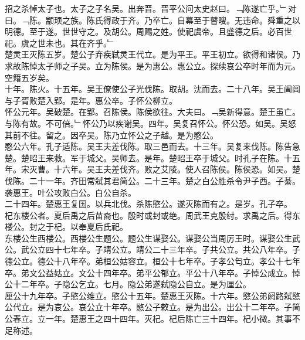 \documentclass{zhvt-classic}
\begin{document}
\hspace*{2em}招之杀悼太子也。太子之子名吴。出奔晋。晋平公问太史赵曰。﹁陈遂亡乎。﹂对曰。﹁陈。颛顼之族。陈氏得政于齐。乃卒亡。自幕至于瞽瞍。无违命。舜重之以明德。至于遂。世世守之。及胡公。周赐之姓。使祀虞帝。且盛德之后。必百世祀。虞之世未也。其在齐乎。﹂\\
\hspace*{2em}楚灵王灭陈五岁。楚公子弃疾弑灵王代立。是为平王。平王初立。欲得和诸侯。乃求故陈悼太子师之子吴。立为陈侯。是为惠公。惠公立。探续哀公卒时年而为元。空籍五岁矣。\\
\hspace*{2em}十年。陈火。十五年。吴王僚使公子光伐陈。取胡。沈而去。二十八年。吴王阖闾与子胥败楚入郢。是年。惠公卒。子怀公柳立。\\
\hspace*{2em}怀公元年。吴破楚。在郢。召陈侯。陈侯欲往。大夫曰。﹁吴新得意。楚王虽亡。与陈有故。不可倍。﹂怀公乃以疾谢吴。四年。吴复召怀公。怀公恐。如吴。吴怒其前不往。留之。因卒吴。陈乃立怀公之子越。是为愍公。\\
\hspace*{2em}愍公六年。孔子适陈。吴王夫差伐陈。取三邑而去。十三年。吴复来伐陈。陈告急楚。楚昭王来救。军于城父。吴师去。是年。楚昭王卒于城父。时孔子在陈。十五年。宋灭曹。十六年。吴王夫差伐齐。败之艾陵。使人召陈侯。陈侯恐。如吴。楚伐陈。二十一年。齐田常弑其君简公。二十三年。楚之白公胜杀令尹子西。子綦。袭惠王。叶公攻败白公。白公自杀。\\
\hspace*{2em}二十四年。楚惠王复国。以兵北伐。杀陈愍公。遂灭陈而有之。是岁。孔子卒。\\
\hspace*{2em}杞东楼公者。夏后禹之后苗裔也。殷时或封或绝。周武王克殷纣。求禹之后。得东楼公。封之于杞。以奉夏后氏祀。\\
\hspace*{2em}东楼公生西楼公。西楼公生题公。题公生谋娶公。谋娶公当周厉王时。谋娶公生武公。武公立四十七年卒。子靖公立。靖公二十三年卒。子共公立。共公八年卒。子德公立。德公十八年卒。弟桓公姑容立。桓公十七年卒。子孝公匄立。孝公十七年卒。弟文公益姑立。文公十四年卒。弟平公郁立。平公十八年卒。子悼公成立。悼公十二年卒。子隐公乞立。七月。隐公弟遂弑隐公自立。是为厘公。\\
\hspace*{2em}厘公十九年卒。子愍公维立。愍公十五年。楚惠王灭陈。十六年。愍公弟阏路弑愍公代立。是为哀公。哀公立十年卒。愍公子敕立。是为出公。出公十二年卒。子简公春立。立一年。楚惠王之四十四年。灭杞。杞后陈亡三十四年。杞小微。其事不足称述。\\
\end{document}
